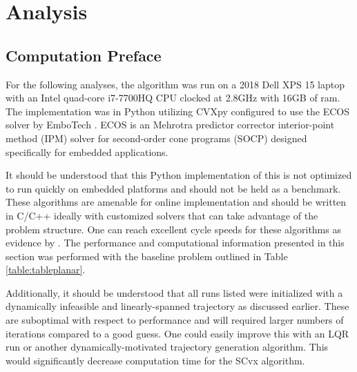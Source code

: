 \chapter{Analysis}
\label{analysis}

\section{Computation Preface}

For the following analyses, the algorithm was run on a 2018 Dell XPS 15 laptop with an Intel quad-core i7-7700HQ CPU clocked at 2.8GHz with 16GB of ram. The implementation was in Python utilizing CVXpy configured to use the ECOS solver by EmboTech \cite{domahidi2013ecos}. ECOS is an Mehrotra predictor corrector interior-point method (IPM) solver for second-order cone programs (SOCP) designed specifically for embedded applications.

It should be understood that this Python implementation of this is not optimized to run quickly on embedded platforms and should not be held as a benchmark. These algorithms are amenable for online implementation and should be written in C/C++ ideally with customized solvers that can take advantage of the problem structure. One can reach excellent cycle speeds for these algorithms as evidence by \cite{szmuk2019successive}. The performance and computational information presented in this section was performed with the baseline problem outlined in Table \ref{table:tableplanar}.

Additionally, it should be understood that all runs listed were initialized with a dynamically infeasible and linearly-spanned trajectory as discussed earlier. These are suboptimal with respect to performance and will required larger numbers of iterations compared to a good guess. One could easily improve this with an LQR run or another dynamically-motivated trajectory generation algorithm. This would significantly decrease computation time for the SCvx algorithm.


